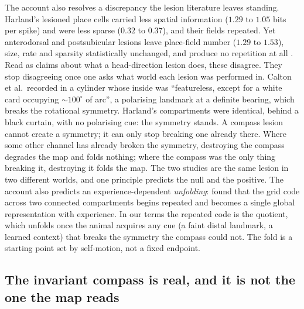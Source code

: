 The account also resolves a discrepancy the lesion literature leaves standing. Harland's lesioned place
cells carried less spatial information ($1.29$ to $1.05$ bits per spike) and were less sparse ($0.32$ to
$0.37$), and their fields repeated. Yet anterodorsal and postsubicular lesions leave place-field number
($1.29$ to $1.53$), size, rate and sparsity statistically unchanged, and produce no repetition at all
\citep{calton2003}. Read as claims about what a head-direction lesion does, these disagree. They stop
disagreeing once one asks what world each lesion was performed in. Calton et al.\ recorded in a cylinder
whose inside was ``featureless, except for a white card occupying $\sim 100^\circ$ of arc'', a
polarising landmark at a definite bearing, which breaks the rotational symmetry. Harland's compartments
were identical, behind a black curtain, with no polarising cue: the symmetry stands. A compass lesion
cannot create a symmetry; it can only stop breaking one already there. Where some other channel has
already broken the symmetry, destroying the compass degrades the map and folds nothing; where the compass
was the only thing breaking it, destroying it folds the map. The two studies are the same lesion in two
different worlds, and one principle predicts the null and the positive. The account also predicts an
experience-dependent \emph{unfolding}: \citet{carpenter2015} found that the grid code across two
connected compartments begins repeated and becomes a single global representation with experience. In our
terms the repeated code is the quotient, which unfolds once the animal acquires any cue (a faint
distal landmark, a learned context) that breaks the symmetry the compass could not. The fold is a
starting point set by self-motion, not a fixed endpoint.

\subsection*{The invariant compass is real, and it is not the one the map reads}

